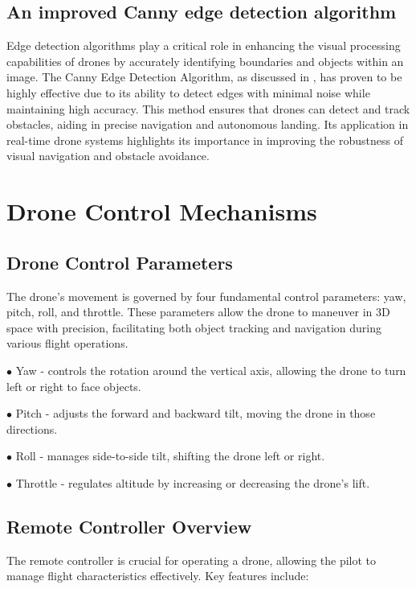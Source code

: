 \documentclass[unnumsec,webpdf,modern,large]{mam-authoring-template}%
\begin{document}
\subsection{An improved Canny edge detection algorithm}
Edge detection algorithms play a critical role in enhancing the visual processing capabilities of drones by accurately identifying boundaries and objects within an image. The Canny Edge Detection Algorithm, as discussed in \cite{rong2014improved}, has proven to be highly effective due to its ability to detect edges with minimal noise while maintaining high accuracy. This method ensures that drones can detect and track obstacles, aiding in precise navigation and autonomous landing. Its application in real-time drone systems highlights its importance in improving the robustness of visual navigation and obstacle avoidance.

\section{Drone Control Mechanisms} \label{sec:mechanisms}
\subsection{Drone Control Parameters}
The drone’s movement is governed by four fundamental control parameters: yaw, pitch, roll, and throttle. 
These parameters allow the drone to maneuver in 3D space with precision, facilitating both object tracking and navigation during various flight operations.
\begin{description}
\item $\bullet$ Yaw - controls the rotation around the vertical axis, allowing the drone to turn left or right to face objects.
\item $\bullet$ Pitch - adjusts the forward and backward tilt, moving the drone in those directions.
\item $\bullet$ Roll - manages side-to-side tilt, shifting the drone left or right.
\item $\bullet$ Throttle - regulates altitude by increasing or decreasing the drone’s lift.
\end{description}

\subsection{Remote Controller Overview} \label{sec:RemoteControllerOverview}

The remote controller is crucial for operating a drone, allowing the pilot to manage flight characteristics effectively. Key features include:
\end{document}
